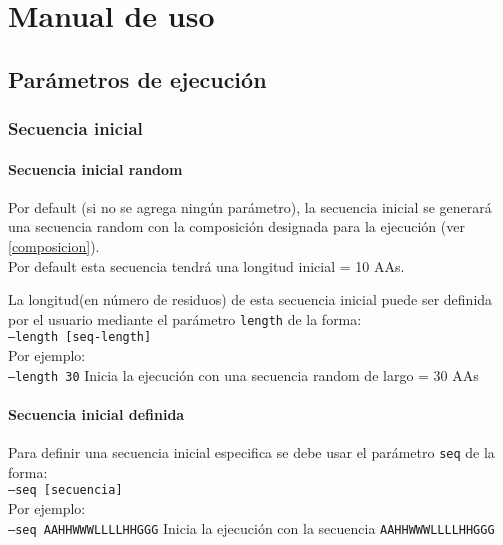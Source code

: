 \chapter{Manual de uso}\label{manual}


\section{Parámetros de ejecución}\label{parametros}


\subsection{Secuencia inicial} \label{secuenciaInicial}
\subsubsection{Secuencia inicial random}\label{secuenciaInicialRandom}
Por default (si no se agrega ningún parámetro), la secuencia inicial se generará una secuencia random con la composición designada para la ejecución (ver \ref{composicion}).\\
Por default esta secuencia tendrá una longitud inicial = 10 AAs.

La longitud(en número de residuos) de esta secuencia inicial puede ser definida por el usuario mediante el parámetro \texttt{length} de la forma: \\
\indent \texttt{--length [seq-length]}
\\Por ejemplo: \\
\indent \texttt{--length 30} \hspace{0.5cm} Inicia la ejecución con una secuencia random de largo = 30 AAs


\subsubsection{Secuencia inicial definida}\label{secuenciaInicialDefinida}
Para definir una secuencia inicial especifica se debe usar el parámetro \texttt{seq} de la forma: \\
\indent \texttt{--seq [secuencia]} 
\\Por ejemplo: \\
\indent \texttt{--seq AAHHWWWLLLLHHGGG} \hspace{0.5cm} Inicia la ejecución con la secuencia \texttt{AAHHWWWLLLLHHGGG}

